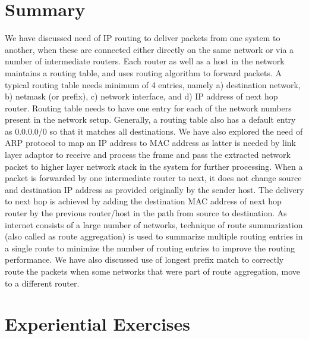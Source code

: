 \begin{multicols}{2}
\section{Summary}\label{chap2-sec8}

We have discussed need of IP routing to deliver packets from one system to another, when these are connected either directly on the same network or via a number of intermediate routers. Each router as well as a host in the network maintains a routing table, and uses routing algorithm to forward packets.  A typical routing table needs minimum of 4 entries, namely a) destination network, b) netmask (or prefix), c) network interface, and d) IP address of next hop router. Routing table needs to have one entry for each of the network numbers present in the network setup. Generally, a routing table also has a default entry as 0.0.0.0/0 so that it matches all destinations. We have also explored the need of ARP protocol to map an IP address to MAC address as latter is needed by link layer adaptor to receive and process the frame and pass the extracted network packet to higher layer network stack in the system for further processing. When a packet is forwarded by one intermediate router to next, it does not change source and destination IP address as provided originally by the sender host. The delivery to next hop is achieved by adding the destination MAC address of next hop router by the previous router/host in the path from source to destination. As internet consists of a large number of networks, technique of route summarization (also called as route aggregation) is used to summarize multiple routing entries in a single route to minimize the number of routing entries to improve the routing performance. We have also discussed use of longest prefix match to correctly route the packets when some networks that were part of route aggregation, move to a different router.

\section{Experiential Exercises}\label{chap2-sec9}


\end{multicols}
